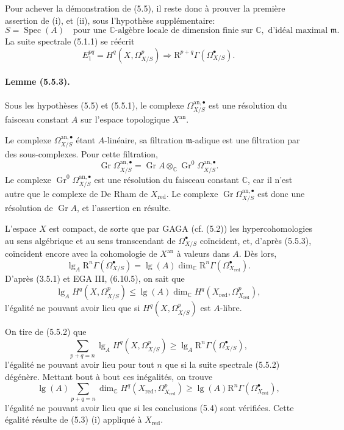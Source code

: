 \documentclass[10pt]{article}
\newcommand{\R}{\mathrm R}
\providecommand{\C}{\mathbb C}
\providecommand{\Spec}{\operatorname{Spec}}
\providecommand{\lgop}{\operatorname{lg}}
\providecommand{\an}{\mathrm{an}}
\providecommand{\red}{\mathrm{red}}
\providecommand{\Gr}{\operatorname{Gr}}
\begin{document}
Pour achever la démonstration de (5.5), il reste donc à prouver la première assertion de (i), et (ii), sous l'hypothèse supplémentaire:
\[
\tag{5.5.1}
S=\Spec(A)\quad\text{pour une }\C\text{-algèbre locale de dimension finie sur }\C,
\text{ d'idéal maximal }\mathfrak m.
\]
La suite spectrale (5.1.1) se réécrit
\[
\tag{5.5.2}
E_1^{pq}=H^q(X,\Omega_{X/S}^p)\Longrightarrow \R^{p+q}\Gamma(\Omega_{X/S}^\bullet).
\]

\paragraph{Lemme (5.5.3).} Sous les hypothèses (5.5) et (5.5.1), le complexe $\Omega_{X/S}^{\an,\bullet}$ est une résolution du faisceau constant $A$ sur l'espace topologique $X^{\an}$.

Le complexe $\Omega_{X/S}^{\an,\bullet}$ étant $A$-linéaire, sa filtration $\mathfrak m$-adique est une filtration par des sous-complexes. Pour cette filtration,
\[
\Gr\Omega_{X/S}^{\an,\bullet}=\Gr A\otimes_\C \Gr^0\Omega_{X/S}^{\an,\bullet}.
\]
Le complexe $\Gr^0\Omega_{X/S}^{\an,\bullet}$ est une résolution du faisceau constant $\C$, car il n'est autre que le complexe de De Rham de $X_{\red}$. Le complexe $\Gr\Omega_{X/S}^{\an,\bullet}$ est donc une résolution de $\Gr A$, et l'assertion en résulte.

L'espace $X$ est compact, de sorte que par GAGA (cf. (5.2)) les hypercohomologies au sens algébrique et au sens transcendant de $\Omega_{X/S}^\bullet$ coïncident, et, d'après (5.5.3), coïncident encore avec la cohomologie de $X^{\an}$ à valeurs dans $A$. Dès lors,
\[
\tag{5.5.4}
\lgop_A \R^n\Gamma(\Omega_{X/S}^\bullet)=\lgop(A)\dim_\C \R^n\Gamma(\Omega_{X_{\red}}^\bullet).
\]
D'après (3.5.1) et EGA III, (6.10.5), on sait que
\[
\tag{5.5.5}
\lgop_A H^q(X,\Omega_{X/S}^p)\le
\lgop(A)\dim_\C H^q(X_{\red},\Omega_{X_{\red}}^p),
\]
l'égalité ne pouvant avoir lieu que si $H^q(X,\Omega_{X/S}^p)$ est $A$-libre.

On tire de (5.5.2) que
\[
\tag{5.5.6}
\sum_{p+q=n}\lgop_A H^q(X,\Omega_{X/S}^p)
\ge \lgop_A\R^n\Gamma(\Omega_{X/S}^\bullet),
\]
l'égalité ne pouvant avoir lieu pour tout $n$ que si la suite spectrale (5.5.2) dégénère. Mettant bout à bout ces inégalités, on trouve
\[
\tag{5.5.7}
\lgop(A)\sum_{p+q=n}\dim_\C H^q(X_{\red},\Omega_{X_{\red}}^p)
\ge
\lgop(A)\R^n\Gamma(\Omega_{X_{\red}}^\bullet),
\]
l'égalité ne pouvant avoir lieu que si les conclusions (5.4) sont vérifiées. Cette égalité résulte de (5.3) (i) appliqué à $X_{\red}$.
\end{document}
